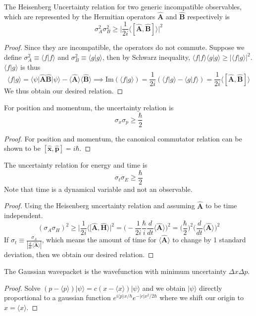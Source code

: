 \documentclass[a4paper]{article}
\begin{document}
\begin{thm}
The Heisenberg Uncertainty relation for two generic incompatible observables, which are represented by the  Hermitian operators $\mathbf{\hat{A}}$ and $\mathbf{\hat{B}}$ respectively is
$$\sigma_A^2\sigma_B^2\geq\bigg|\frac{1}{2i}\big\langle[\mathbf{\hat{A}},\mathbf{\hat{B}}]\big\rangle\bigg|^2$$
\end{thm}
\begin{proof}
Since they are incompatible, the operators do not commute. Suppose we define $\sigma_A^2\equiv\big\langle f|f\big\rangle$ and $\sigma_B^2\equiv\big\langle g|g\big\rangle$, then by Schwarz inequality,
$\big\langle f|f\big\rangle\big\langle g|g\big\rangle\geq|\big\langle f|g\big\rangle|^2$. 
$\big\langle f|g\big\rangle$ is thus
$$\big\langle f|g\big\rangle=\big\langle\psi|\mathbf{\hat{A}}\mathbf{\hat{B}}|\psi\big\rangle-\big\langle\mathbf{\hat{A}}\big\rangle\big\langle\mathbf{\hat{B}}\big\rangle\implies\text{Im}(\big\langle f|g\big\rangle)=\frac{1}{2i}(\big\langle f|g\big\rangle-\big\langle g|f\big\rangle)=\frac{1}{2i}\big\langle[\mathbf{\hat{A}},\mathbf{\hat{B}}]\big\rangle$$
We thus obtain our desired relation.
\end{proof}
\begin{cor}
For position and momentum, the uncertainty relation is 
$$\sigma_x\sigma_p\geq\frac{\hbar}{2}$$
\end{cor}
\begin{proof}
For position and momentum, the canonical commutator relation can be shown to be $[\mathbf{\hat{x}},\mathbf{\hat{p}}]=i\hbar$.
\end{proof}
\begin{cor}
The uncertainty relation for energy and time is
$$\sigma_t\sigma_E\geq\frac{\hbar}{2}$$
Note that time is a dynamical variable and not an observable.
\end{cor}
\begin{proof}
Using the Heisenberg uncertainty relation and assuming $\mathbf{\hat{A}}$ to be time independent.
$$
(\sigma_A\sigma_H)^2\geq\bigg|\frac{1}{2i}\big\langle[\mathbf{\hat{A}},\mathbf{\hat{H}}\big\rangle\bigg|^2=\bigg(-\frac{1}{2i}\frac{\hbar}{i}\frac{d}{dt}\big\langle\mathbf{\hat{A}}\big\rangle\bigg)^2=\bigg(\frac{\hbar}{2}\bigg)^2\bigg(\frac{d}{dt}\big\langle\mathbf{\hat{A}}\big\rangle\bigg)^2$$
If $\sigma_t\equiv\frac{\sigma_A}{|\frac{d}{dt}\langle\mathbf{\hat{A}}\rangle|}$, which means the amount of time for $\big\langle\mathbf{\hat{A}}\big\rangle$ to change by 1 standard deviation, then we obtain our desired relation.
\end{proof}
\begin{thm}
The Gaussian wavepacket is the wavefunction with minimum uncertainty $\Delta x\Delta p$.
\end{thm}
\begin{proof}
Solve $(p-\langle p\rangle)|\psi\rangle=c(x-\langle x\rangle)|\psi\rangle$ and we obtain $|\psi\rangle$ directly proportional to a gaussian function $e^{i\langle p\rangle x/\hbar}e^{-|c|x^2/2\hbar}$ where we shift our origin to $x=\langle x\rangle$.
\end{proof}
\newpage
\end{document}
